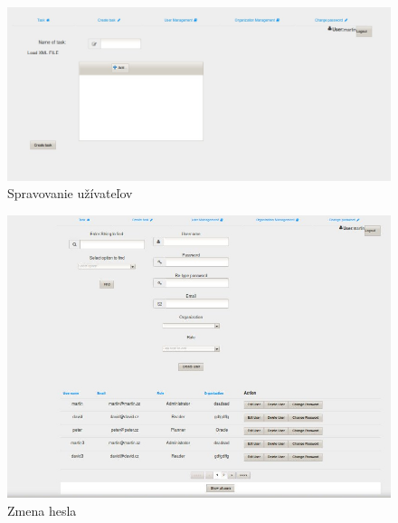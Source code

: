 {\begin{figure}[htb]
\begin{center}
\end{center}

\end{figure}

\begin{figure}[htb]

\begin{center}

\includegraphics[scale=0.5]{page2.jpg} 
\caption{Spravovanie užívateľov}


\end{center}

\end{figure}


\begin{figure}[htb]

\begin{center}

\includegraphics[scale=0.5]{page3.jpg} 
\caption{Zmena hesla}


\end{center}

\end{figure}

}
